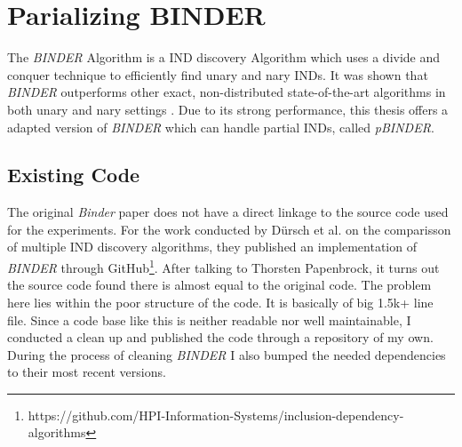 \section{Parializing BINDER}
The \textit{BINDER} Algorithm \cite{papenbrock2015divide} is a IND discovery Algorithm which uses a divide and conquer technique to efficiently find unary and nary INDs. It was shown that \textit{BINDER} outperforms other exact, non-distributed state-of-the-art algorithms in both unary and nary settings \cite{dursch2019inclusion}. Due to its strong performance, this thesis offers a adapted version of \textit{BINDER} which can handle partial INDs, called \textit{pBINDER}.

\subsection{Existing Code}
The original \textit{Binder} paper does not have a direct linkage to the source code used for the experiments. For the work conducted by Dürsch et al. on the comparisson of multiple IND discovery algorithms, they published an implementation of \textit{BINDER} through GitHub\footnote{https://github.com/HPI-Information-Systems/inclusion-dependency-algorithms}. After talking to Thorsten Papenbrock, it turns out the source code found there is almost equal to the original code. The problem here lies within the poor structure of the code. It is basically of big 1.5k+ line file. Since a code base like this is neither readable nor well maintainable, I conducted a clean up and published the code through a repository of my own. %
During the process of cleaning \textit{BINDER} I also bumped the needed dependencies to their most recent versions.
